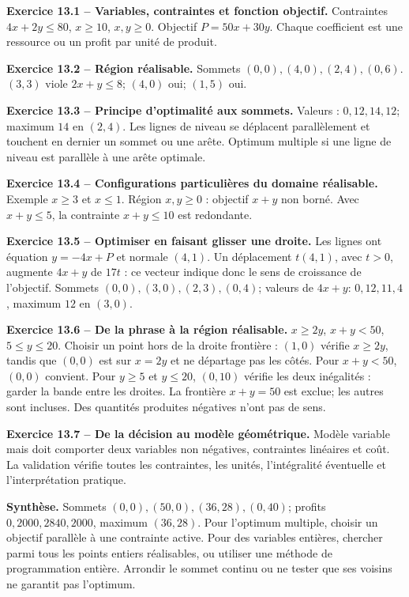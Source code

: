 \begin{answerbox}
\textbf{Exercice 13.1 -- Variables, contraintes et fonction objectif.} Contraintes $4x+2y\le80$, $x\ge10$, $x,y\ge0$. Objectif $P=50x+30y$. Chaque coefficient est une ressource ou un profit par unité de produit.\par
\textbf{Exercice 13.2 -- Région réalisable.} Sommets $(0,0),(4,0),(2,4),(0,6)$. $(3,3)$ viole $2x+y\le8$; $(4,0)$ oui; $(1,5)$ oui.\par
\textbf{Exercice 13.3 -- Principe d'optimalité aux sommets.} Valeurs : $0,12,14,12$; maximum $14$ en $(2,4)$. Les lignes de niveau se déplacent parallèlement et touchent en dernier un sommet ou une arête. Optimum multiple si une ligne de niveau est parallèle à une arête optimale.\par
\textbf{Exercice 13.4 -- Configurations particulières du domaine réalisable.} Exemple $x\ge3$ et $x\le1$. Région $x,y\ge0$ : objectif $x+y$ non borné. Avec $x+y\le5$, la contrainte $x+y\le10$ est redondante.\par
\textbf{Exercice 13.5 -- Optimiser en faisant glisser une droite.} Les lignes ont équation $y=-4x+P$ et normale $(4,1)$. Un déplacement $t(4,1)$, avec $t>0$, augmente $4x+y$ de $17t$ : ce vecteur indique donc le sens de croissance de l'objectif. Sommets $(0,0),(3,0),(2,3),(0,4)$; valeurs de $4x+y$: $0,12,11,4$, maximum $12$ en $(3,0)$.\par
\textbf{Exercice 13.6 -- De la phrase à la région réalisable.} $x\ge2y$, $x+y<50$, $5\le y\le20$. Choisir un point hors de la droite frontière : $(1,0)$ vérifie $x\ge2y$, tandis que $(0,0)$ est sur $x=2y$ et ne départage pas les côtés. Pour $x+y<50$, $(0,0)$ convient. Pour $y\ge5$ et $y\le20$, $(0,10)$ vérifie les deux inégalités : garder la bande entre les droites. La frontière $x+y=50$ est exclue; les autres sont incluses. Des quantités produites négatives n'ont pas de sens.\par
\textbf{Exercice 13.7 -- De la décision au modèle géométrique.} Modèle variable mais doit comporter deux variables non négatives, contraintes linéaires et coût. La validation vérifie toutes les contraintes, les unités, l'intégralité éventuelle et l'interprétation pratique.\par
\medskip\textbf{Synthèse.} Sommets $(0,0),(50,0),(36,28),(0,40)$; profits $0,2000,2840,2000$, maximum $(36,28)$. Pour l'optimum multiple, choisir un objectif parallèle à une contrainte active. Pour des variables entières, chercher parmi tous les points entiers réalisables, ou utiliser une méthode de programmation entière. Arrondir le sommet continu ou ne tester que ses voisins ne garantit pas l'optimum.
\end{answerbox}
